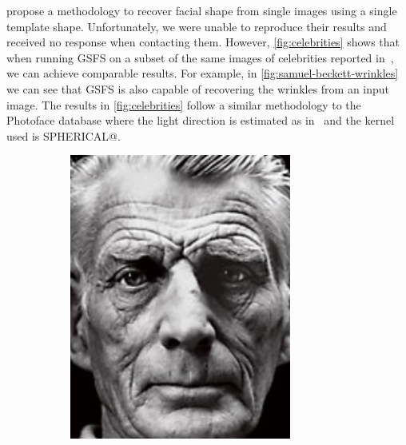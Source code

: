 \citet{RefWorks:226} propose a methodology to recover 
facial shape from single images using a single template shape. Unfortunately, 
we were unable to reproduce their results and received no response when 
contacting them. However, \cref{fig:celebrities} shows that when running 
GSFS on a subset of the same images of celebrities reported in~\cite{RefWorks:226}, 
we can achieve comparable results. For example, in \cref{fig:samuel-beckett-wrinkles} 
we can see that GSFS is also capable of recovering the wrinkles from an input image. 
The results in \cref{fig:celebrities} follow a similar methodology to the 
Photoface database where the light direction is estimated as in~\cite{RefWorks:226} 
and the kernel used is SPHERICAL@.
\begin{figure}
    \centering
    \begin{subfigure}{0.32\textwidth}
        \centering
        \includegraphics[width=0.8\textwidth]{statistical_normals/images/gsfs_results/celebrities/samuel_beckett.png}
\label{fig:samuel-beckett-input}
    \end{subfigure}
    \begin{subfigure}{0.32\textwidth}
        \centering

\end{subfigure}
\end{figure}
